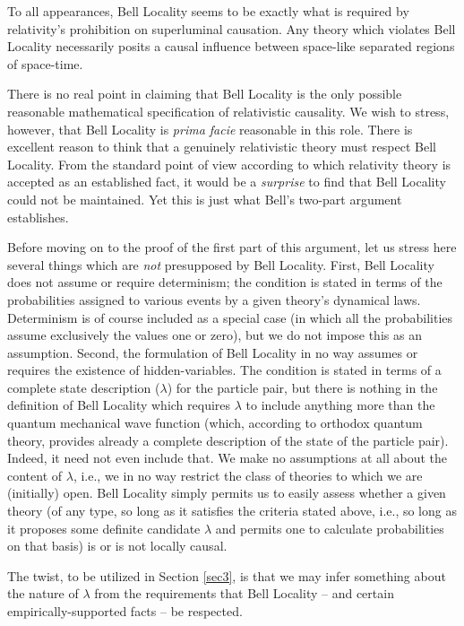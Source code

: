 \documentclass[aps,prc,onecolumn,12pt]{revtex4-2}
\begin{document}
To all appearances, Bell Locality seems
to be exactly what is required by relativity's prohibition on
superluminal causation.  Any theory which violates Bell Locality
necessarily posits a causal influence between space-like separated
regions of space-time.

There is no real point in claiming that Bell Locality is the only
possible reasonable mathematical specification of relativistic
causality.  We wish to stress,
however, that Bell Locality is \emph{prima facie} reasonable
in this role.
There is excellent reason to think that a genuinely relativistic
theory must respect Bell Locality.
From the standard point of view according to which relativity theory
is accepted as an established fact, it would be a
\emph{surprise} to find that Bell Locality could not be maintained.
Yet this is just what Bell's two-part argument establishes.

Before moving on to the proof of the first part of this argument,
let us stress here several
things which are \emph{not} presupposed by Bell Locality.  First,
Bell Locality does not assume or require determinism; the condition
is stated in terms of the probabilities assigned to various events
by a given
theory's dynamical laws.  Determinism is of course included as a
special case (in which all the probabilities assume exclusively the
values one or zero), but we do not impose this as an assumption.
Second, the formulation of Bell Locality in no way assumes or requires
the existence of hidden-variables.  The condition is stated in terms of a
complete state description ($\lambda$) for the particle pair, but
there is nothing in the definition of Bell Locality which requires
$\lambda$ to include anything more than the quantum mechanical wave
function (which, according to orthodox quantum theory, provides
already a complete description of the state of the particle pair).
Indeed, it need not even include that.  We make no
assumptions at all about the content of $\lambda$, i.e., we in no way
restrict the class of theories to which we are (initially) open.
Bell Locality simply permits us to easily assess whether a
given theory (of any type, so long as it satisfies the criteria stated
above, i.e., so long as it proposes some definite
candidate $\lambda$ and permits one to calculate probabilities on
that basis) is or is not locally causal.

The twist, to be utilized in Section \ref{sec3}, is that we may
infer something about the nature of $\lambda$ from the requirements
that Bell Locality -- and certain empirically-supported facts -- be
respected.
\end{document}
